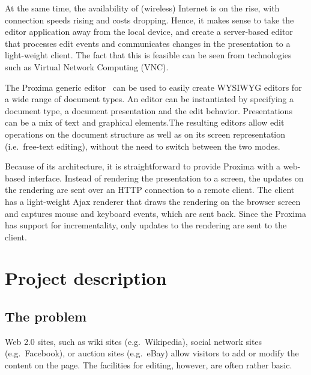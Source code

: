 \documentclass[10pt]{article}
\begin{document}
At the same time, the availability of (wireless) Internet is on the rise, with connection speeds rising and costs dropping. Hence, it makes sense to take the editor application away from the local device, and create a server-based editor that processes edit events and communicates changes in the presentation to a light-weight client. The fact that this is feasible can be seen from technologies such as Virtual Network Computing (VNC).

The Proxima generic editor~\cite{schrage08proximaHome, schrage04proxima} can be used to easily create WYSIWYG editors for a wide range of document types. An editor can be instantiated by specifying a document type, a document presentation and the edit behavior. Presentations can be a mix of text and graphical elements.The resulting editors allow edit operations on the document structure as well as on its screen representation (i.e.\ free-text editing), without the need to switch between the two modes.

Because of its architecture, it is straightforward to provide Proxima with a web-based interface. Instead of rendering the presentation to a screen, the updates on the rendering are sent over an HTTP connection to a remote client. The client has a light-weight Ajax renderer that draws the rendering on the browser screen and captures mouse and keyboard events, which are sent back. Since the Proxima has support for incrementality, only updates to the rendering are sent to the client.

\ec



\section{Project description}

\subsection{The problem} 

Web 2.0 sites, such as wiki sites (e.g.\ Wikipedia), social network sites (e.g.\ Facebook), or auction sites (e.g.\ eBay) allow visitors to add or modify the content on the page. The facilities for editing, however, are often rather basic. 
\end{document}
